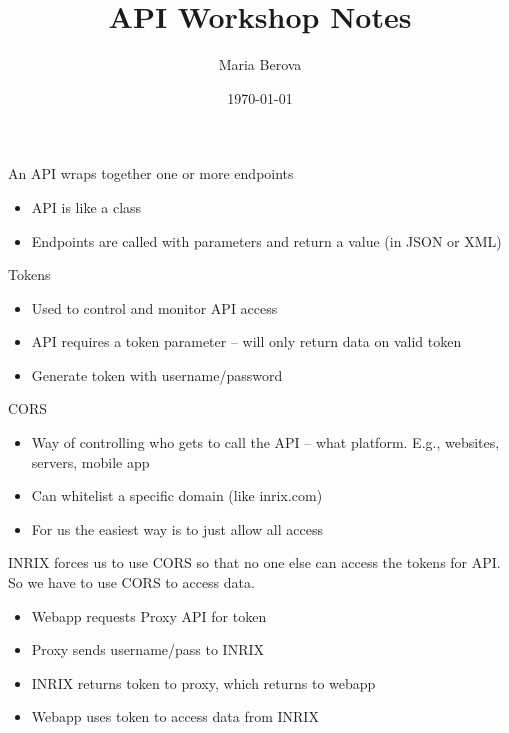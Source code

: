 \documentclass{article}
\title{\textbf{API Workshop Notes}}
\author{Maria Berova}
\date{\today}
\begin{document}
\maketitle

An API wraps together one or more endpoints

\begin{itemize}
  \item API is like a class
  \item Endpoints are called with parameters and return a value (in JSON or XML)
\end{itemize}

Tokens

\begin{itemize}
  \item Used to control and monitor API access
  \item API requires a token parameter -- will only return data on valid token
  \item Generate token with username/password
\end{itemize}

CORS

\begin{itemize}
  \item Way of controlling who gets to call the API -- what platform. E.g., websites, servers, mobile app
  \item Can whitelist a specific domain (like inrix.com)
  \item For us the easiest way is to just allow all access
\end{itemize}

INRIX forces us to use CORS so that no one else can access the tokens for API. So we have to use CORS to access data.

\begin{itemize}
  \item Webapp requests Proxy API for token
  \item Proxy sends username/pass to INRIX 
  \item INRIX returns token to proxy, which returns to webapp
  \item Webapp uses token to access data from INRIX
\end{itemize}

\end{document}
